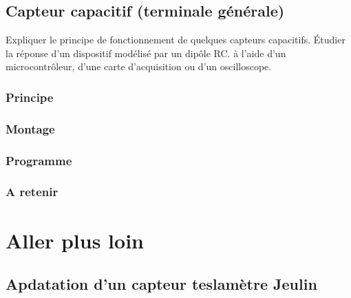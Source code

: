 \documentclass[a4paper,10pt,french]{book}
\begin{document}
\section{Capteur capacitif (terminale générale)}
\label{\detokenize{4_lycee/7_terminale_capteur_capacitif:capteur-capacitif-terminale-generale}}\label{\detokenize{4_lycee/7_terminale_capteur_capacitif::doc}}
\begin{sphinxShadowBox}

Expliquer le principe de fonctionnement de quelques capteurs capacitifs. Étudier la réponse d’un dispositif modélisé par un dipôle RC.  à l’aide d’un microcontrôleur, d’une carte d’acquisition ou d’un oscilloscope.
\end{sphinxShadowBox}


\subsection{Principe}
\label{\detokenize{4_lycee/7_terminale_capteur_capacitif:principe}}

\subsection{Montage}
\label{\detokenize{4_lycee/7_terminale_capteur_capacitif:montage}}

\subsection{Programme}
\label{\detokenize{4_lycee/7_terminale_capteur_capacitif:programme}}

\subsection{A retenir}
\label{\detokenize{4_lycee/7_terminale_capteur_capacitif:a-retenir}}

\chapter{Aller plus loin}
\label{\detokenize{5_aller_plus_loin/index:aller-plus-loin}}\label{\detokenize{5_aller_plus_loin/index::doc}}

\section{Apdatation d’un capteur teslamètre Jeulin}
\label{\detokenize{5_aller_plus_loin/1_teslametre:apdatation-d-un-capteur-teslametre-jeulin}}\label{\detokenize{5_aller_plus_loin/1_teslametre::doc}}
\end{document}
